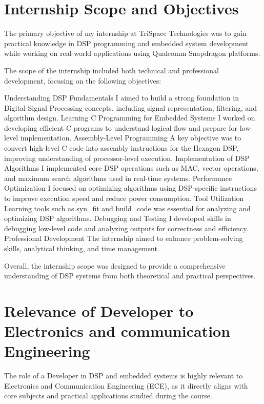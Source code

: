 \documentclass[12pt,a4paper]{report}
\begin{document}
\section{Internship Scope and Objectives}

The primary objective of my internship at TriSpace Technologies was to gain practical knowledge in DSP programming and embedded system development while working on real-world applications using Qualcomm Snapdragon platforms.


The scope of the internship included both technical and professional development, focusing on the following objectives:


Understanding DSP Fundamentals I aimed to build a strong foundation in Digital Signal Processing concepts, including signal representation, filtering, and algorithm design. Learning C Programming for Embedded Systems I worked on developing efficient C programs to understand logical flow and prepare for low-level implementation. Assembly-Level Programming A key objective was to convert high-level C code into assembly instructions for the Hexagon DSP, improving understanding of processor-level execution. Implementation of DSP Algorithms I implemented core DSP operations such as MAC, vector operations, and maximum search algorithms used in real-time systems. Performance Optimization I focused on optimizing algorithms using DSP-specific instructions to improve execution speed and reduce power consumption. Tool Utilization Learning tools such as syn\_fit and build\_code was essential for analyzing and optimizing DSP algorithms. Debugging and Testing I developed skills in debugging low-level code and analyzing outputs for correctness and efficiency. Professional Development The internship aimed to enhance problem-solving skills, analytical thinking, and time management.


Overall, the internship scope was designed to provide a comprehensive understanding of DSP systems from both theoretical and practical perspectives.


\section{Relevance of Developer to Electronics and communication Engineering}

The role of a Developer in DSP and embedded systems is highly relevant to Electronics and Communication Engineering (ECE), as it directly aligns with core subjects and practical applications studied during the course.
\end{document}
